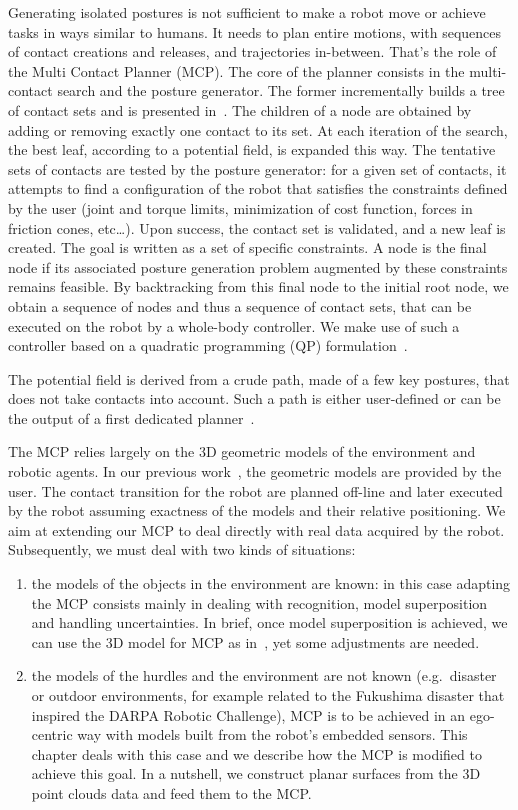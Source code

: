Generating isolated postures is not sufficient to make a robot move or achieve tasks in ways similar to humans.
It needs to plan entire motions, with sequences of contact creations and releases, and trajectories in-between.
That's the role of the Multi Contact Planner (MCP).
The core of the planner consists in the multi-contact search and the posture generator.
The former incrementally builds a tree of contact sets and is presented in~\cite{escande:ras:2013}.
The children of a node are obtained by adding or removing exactly one contact to its set.
At each iteration of the search, the best leaf, according to a potential field, is expanded this way.
The tentative sets of contacts are tested by the posture generator: for a given set of contacts, it attempts to find a configuration of the robot that satisfies the constraints defined by the user (joint and torque limits, minimization of cost function, forces in friction cones, etc\ldots).
Upon success, the contact set is validated, and a new leaf is created.
The goal is written as a set of specific constraints.
A node is the final node if its associated posture generation problem augmented by these constraints remains feasible.
By backtracking from this final node to the initial root node, we obtain a sequence of nodes and thus a sequence of contact sets, that can be executed on the robot by a whole-body controller.
We make use of such a controller based on a quadratic programming (QP) formulation~\cite{bouyarmane:iros:2011}.

The potential field is derived from a crude path, made of a few key postures, that does not take contacts into account.
Such a path is either user-defined or can be the output of a first dedicated planner~\cite{bouyarmane:icra:2009}.

The MCP relies largely on the 3D geometric models of the environment and robotic agents.
In our previous work~\cite{escande:ras:2013,bouyarmane:ar:2012}, the geometric models are provided by the user.
The contact transition for the robot are planned off-line and later executed by the robot assuming exactness of the models and their relative positioning.
We aim at extending our MCP to deal directly with real data acquired by the robot.
Subsequently, we must deal with two kinds of situations:
\begin{enumerate}
  \item the models of the objects in the environment are known: in this case adapting the MCP consists mainly in dealing with recognition, model superposition and handling uncertainties.
  In brief, once model superposition is achieved, we can use the 3D model for MCP as in~\cite{escande:ras:2013,bouyarmane:ar:2012}, yet some adjustments are needed.
  \item the models of the hurdles and the environment are not known (e.g.\ disaster or outdoor environments, for example related to the Fukushima disaster that inspired the DARPA Robotic Challenge), MCP is to be achieved in an ego-centric way with models built from the robot's embedded sensors.
  This chapter deals with this case and we describe how the MCP is modified to achieve this goal.
  In a nutshell, we construct planar surfaces from the 3D point clouds data and feed them to the MCP.\@
\end{enumerate}

